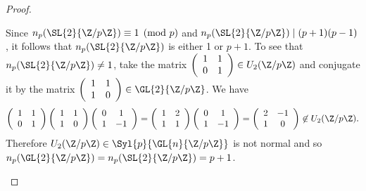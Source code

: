 \documentclass[10pt]{amsart}
\begin{document}
\begin{thm}
\begin{proof}
\begin{enumerate}[(a)]
      Since $n_p(\SL{2}{\Z/p\Z}) \equiv 1 \pmod{p}$ and $n_p(\SL{2}{\Z/p\Z}) \mid (p+1)(p-1)$, it follows that $n_p(\SL{2}{\Z/p\Z})$ is either 1 or $p+1$.
      To see that $n_p(\SL{2}{\Z/p\Z}) \not = 1$, take the matrix $\left(\begin{array}{cc}
        1 & 1\\
        0 & 1
      \end{array}\right) \in U_2(\Z/p\Z)$ and conjugate it by the matrix $\left(\begin{array}{cc}
        1 & 1\\
        1 & 0
      \end{array}\right) \in \GL{2}{\Z/p\Z}$.
      We have
      $$\left(\begin{array}{cc}
        1 & 1\\
        0 & 1
      \end{array}\right)\left(\begin{array}{cc}
        1 & 1\\
        1 & 0
      \end{array}\right)
      \left(\begin{array}{cc}
        0 & 1\\
        1 & -1
      \end{array}\right) = \left(\begin{array}{cc}
        1 & 2\\
        1 & 1
      \end{array}\right)\left(\begin{array}{cc}
        0 & 1\\
        1 & -1
      \end{array}\right)
      =
      \left(\begin{array}{cc}
        2  & -1\\
        1 & 0
      \end{array}\right) \not \in U_2(\Z/p\Z).$$
      Therefore $U_2(\Z/p\Z)\in \Syl{p}{\GL{n}{\Z/p\Z}}$ is not normal and so $n_p(\GL{2}{\Z/p\Z})  = n_p(\SL{2}{\Z/p\Z}) = p + 1$.
    \end{enumerate}  
  \end{proof}
\end{thm}
\end{document}

